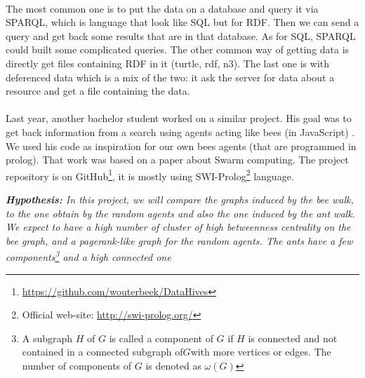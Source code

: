 \documentclass{article}
\begin{document}
	\paragraph{}	%
		The most common one is to put the data on a database and query it via SPARQL,
		which is language that look like SQL but for RDF.
		Then we can send a query and get back some results that are in that database.
		As for SQL, SPARQL could built some complicated queries.
		The other common way of getting data is directly get files containing RDF in it (turtle, rdf, n3).
		The last one is with deferenced data which is a mix of the two:
		it ask the server for data about a resource and get a file containing the data.
	\paragraph{}	%
		Last year, another bachelor student worked on a similar project.
		His goal was to get back information from a search using agents acting like bees (in JavaScript) \cite{Kroes13,Kroes13-2}.
		We used his code as inspiration for our own bees agents (that are programmed in prolog).
		That work was based on a paper \cite{Gueret10} about Swarm computing.
		The project repository is on GitHub\footnote{ \url{https://github.com/wouterbeek/DataHives}},
		it is mostly using SWI-Prolog\footnote{ Official web-site: \url{http://swi-prolog.org/}} language.
		\begin{center}
			\textit{
			\textbf{Hypothesis:} In this project, we will compare the graphs induced by the bee walk,
				to the one obtain by the random agents and also the one induced by the ant walk.
				We expect to have a high number of cluster of high betweenness centrality on the bee graph,
				and a pagerank-like graph for the random agents.
				The ants have a few components\footnote{
					A subgraph $H$ of $G$ is called a component of $G$ if $H$ is connected
					and not contained in a connected subgraph of$G$with more vertices or edges.
					The number of components of $G$ is denoted as $\omega(G)$}
				and a high connected one}
		\end{center}

\end{document}
